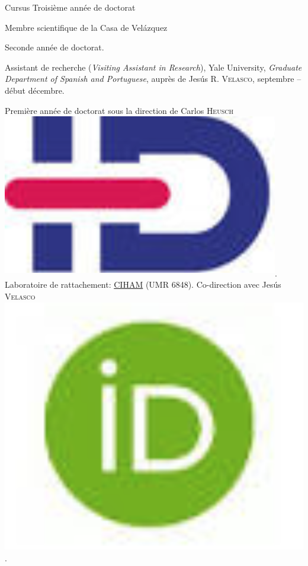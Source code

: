  \begin{rubric}{Cursus}
                                \entry*[2020-2021]
                            Troisième année de doctorat
                    
                                \entry*
                            Membre scientifique de la Casa de
                        Velázquez
                    
                                \entry*[2019-2020]
                            Seconde année de doctorat.
                    
                                \entry*
                            Assistant de recherche (\textit{Visiting Assistant in
                        Research}), Yale University, \textit{Graduate Department
                        of Spanish and Portuguese}, auprès de Jesús R.
                        \textsc{Velasco}, septembre -- début décembre.
                    
                    
                                \entry*[2018-2019]
                            Première année de doctorat sous la direction de
                        Carlos \textsc{Heusch}\href{https://www.idref.fr/055838413}{\textsuperscript{\includegraphics[scale=0.025]{img/idref.png}}}.
                        Laboratoire de rattachement: \href{http://ciham.ish-lyon.cnrs.fr/}{CIHAM} (UMR
                        6848). Co-direction avec Jesús \textsc{
                        Velasco}\href{https://orcid.org/0000-0002-3848-9230}{\includegraphics[scale=0.025]{img/orcid.png}}.
                    

\end{rubric}
